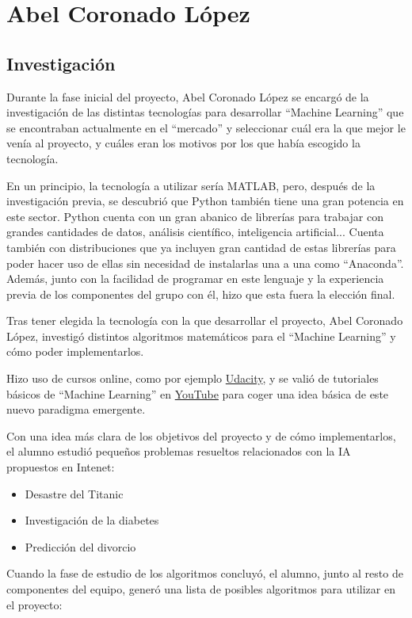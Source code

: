 \section{Abel Coronado López}
\subsection{Investigación}

Durante la fase inicial del proyecto, Abel Coronado López se encargó de la investigación de las distintas tecnologías para desarrollar ``Machine Learning'' que se encontraban actualmente en el ``mercado'' y seleccionar cuál era la que mejor le venía al proyecto, y cuáles eran los motivos por los que había escogido la tecnología.

En un principio, la tecnología a utilizar sería MATLAB, pero, después de la investigación previa, se descubrió que Python también tiene una gran potencia en este sector. Python cuenta con un gran abanico de librerías para trabajar con grandes cantidades de datos, análisis científico, inteligencia artificial... Cuenta también con distribuciones que ya incluyen gran cantidad de estas librerías para poder hacer uso de ellas sin necesidad de instalarlas una a una como ``Anaconda''. Además, junto con la facilidad de programar en este lenguaje y la experiencia previa de los componentes del grupo con él, hizo que esta fuera la elección final.

Tras tener elegida la tecnología con la que desarrollar el proyecto, Abel Coronado López, investigó distintos algoritmos matemáticos para el ``Machine Learning'' y cómo poder implementarlos.

Hizo uso de cursos online, como por ejemplo \href{https://www.udacity.com}{Udacity}, y se valió de tutoriales básicos de ``Machine Learning'' en \href{https://www.youtube.com}{YouTube} para coger una idea básica de este nuevo paradigma emergente.

Con una idea más clara de los objetivos del proyecto y de cómo implementarlos, el alumno estudió pequeños problemas resueltos relacionados con la IA propuestos en Intenet:

\begin{itemize}
\item Desastre del Titanic
\item Investigación de la diabetes
\item Predicción del divorcio
\end{itemize}

Cuando la fase de estudio de los algoritmos concluyó, el alumno, junto al resto de componentes del equipo, generó una lista de posibles algoritmos para utilizar en el proyecto: 

